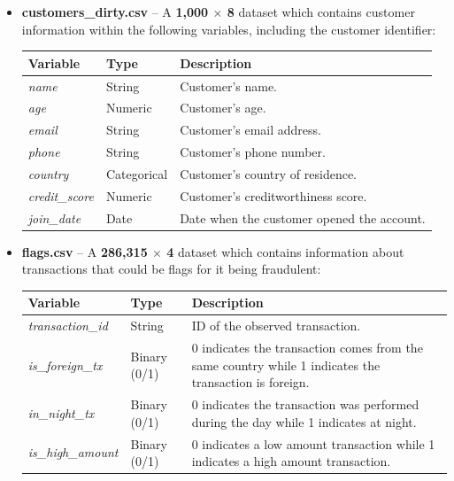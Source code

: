 \documentclass[12pt,a4paper]{report}
\begin{document}
\begin{itemize}
    \item \textbf{customers\_dirty.csv} – A \textbf{1,000 $\times$ 8} dataset which contains customer information 
    within the following variables, including the customer identifier:

    \begin{center}
    \begin{tabular}{|l|l|p{8cm}|}
        \hline
        \textbf{Variable} & \textbf{Type} & \textbf{Description} \\
        \hline
        \textit{name} & String & Customer's name. \\
        \hline
        \textit{age} & Numeric & Customer's age. \\
        \hline
        \textit{email} & String & Customer's email address. \\
        \hline
        \textit{phone} & String & Customer's phone number. \\
        \hline
        \textit{country} & Categorical & Customer's country of residence. \\
        \hline
        \textit{credit\_score} & Numeric & Customer's creditworthiness score. \\
        \hline
        \textit{join\_date} & Date & Date when the customer opened the account. \\
        \hline
    \end{tabular}
    \end{center}

    \item \textbf{flags.csv} – A \textbf{286,315 $\times$ 4} dataset which contains  information 
    about transactions that could be flags for it being fraudulent:

    \begin{center}
    \begin{tabular}{|l|l|p{8cm}|}
        \hline
        \textbf{Variable} & \textbf{Type} & \textbf{Description} \\
        \hline
        \textit{transaction\_id} & String & ID of the observed transaction. \\
        \hline
        \textit{is\_foreign\_tx} & Binary (0/1) & 0 indicates the transaction comes from the same country while 1 indicates the transaction is foreign. \\
        \hline
        \textit{in\_night\_tx} & Binary (0/1) & 0 indicates the transaction was performed during the day while 1 indicates at night. \\
        \hline
        \textit{is\_high\_amount} & Binary (0/1) & 0 indicates a low amount transaction while 1 indicates a high amount transaction. \\
        \hline
    \end{tabular}
    \end{center}


\end{itemize}
\end{document}
